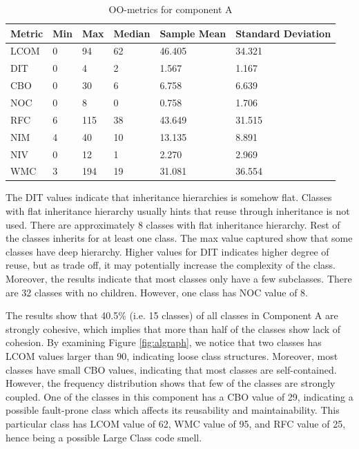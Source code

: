 \begin{table}[]
\centering
\caption{OO-metrics for component A}
\label{tab:oometrics-al}
\begin{tabular}{|l|l|l|l|l|l|}
\hline
\textbf{Metric} & \textbf{Min} & \textbf{Max} & \textbf{Median} & \textbf{Sample Mean} & \textbf{Standard Deviation} \\ \hline
LCOM            & 0            & 94           & 62              & 46.405               & 34.321                      \\ \hline
DIT             & 0            & 4            & 2               & 1.567                & 1.167                       \\ \hline
CBO             & 0            & 30           & 6               & 6.758                & 6.639                       \\ \hline
NOC             & 0            & 8            & 0               & 0.758                & 1.706                       \\ \hline
RFC             & 6            & 115          & 38            & 43.649               & 31.515                      \\ \hline
NIM             & 4            & 40           & 10              & 13.135                 & 8.891                       \\ \hline
NIV             & 0            & 12           & 1               & 2.270                  & 2.969                       \\ \hline
WMC           & 3            & 194          & 19              & 31.081                 & 36.554                      \\ \hline
\end{tabular}
\end{table}

The DIT values indicate that inheritance hierarchies is somehow flat. Classes with flat inheritance hierarchy usually hints that reuse through inheritance is not used. There are approximately 8 classes with flat inheritance hierarchy. Rest of the classes inherits for at least one class. The max value captured show that some classes have deep hierarchy. Higher values for DIT indicates higher degree of reuse, but as trade off, it may potentially increase the complexity of the class. Moreover, the results indicate that most classes only have a few subclasses. There are 32 classes with no children. However, one class has NOC value of 8. 

The results show that 40.5\% (i.e. 15 classes) of all classes in Component A are strongly cohesive, which implies that more than half of the classes show lack of cohesion. By examining Figure \ref{fig:algraph}, we notice that two classes has LCOM values larger than 90, indicating loose class structures. Moreover, most classes have small CBO values, indicating that most classes are self-contained. However, the frequency distribution shows that few of the classes are strongly coupled. One of the classes in this component has a CBO value of 29, indicating a possible fault-prone class which affects its reusability and maintainability. This particular class has LCOM value of 62, WMC value of 95, and RFC value of 25, hence being a possible Large Class code smell.

